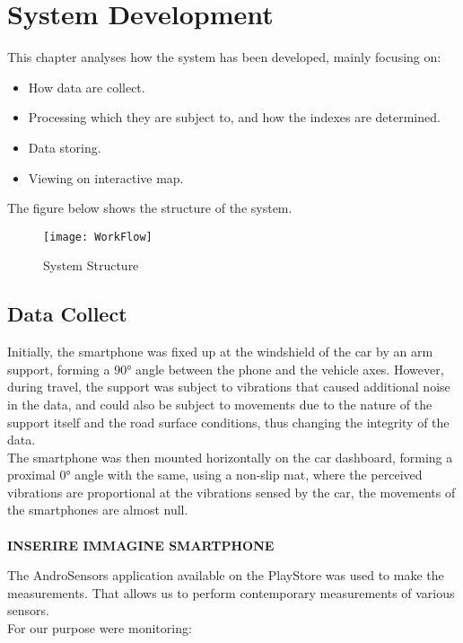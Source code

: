 \documentclass[tesi]{subfiles}
\begin{document}
\chapter{System Development}
\label{ch:System Development}
This chapter analyses how the system has been developed, mainly focusing on:

\begin{itemize}
\item How data are collect.
\item Processing which they are subject to, and how the indexes are determined.
\item Data storing.
\item Viewing on interactive map.
\end{itemize}


\clearpage
\noindent The figure below shows the structure of the system.
\begin{figure}[H]
\centering
\texttt{[image: WorkFlow]}
\caption{System Structure}

\end{figure}\label{fig:System Structure}

\section{Data Collect}\label{sc:Data Collect}
Initially, the smartphone was fixed up at the windshield of the car by an arm support, forming a $90\si{\degree}$ angle between the phone and the vehicle axes. 
However, during travel, the support was subject to vibrations that caused additional noise in the data, and could also be subject to movements due to the nature of the support itself and the road surface conditions, thus changing the integrity of the data.\\
The smartphone was then mounted horizontally on the car dashboard, forming a proximal $0\si{\degree}$ angle with the same, using a non-slip mat, where the perceived vibrations are proportional at the vibrations sensed by the car, the movements of the smartphones are almost null.\\
\\

\textbf{{\LARGE INSERIRE IMMAGINE SMARTPHONE}}

The AndroSensors application available on the PlayStore was used to make the measurements. That allows us to perform contemporary measurements of various sensors.\\
For our purpose were monitoring:
\end{document}
